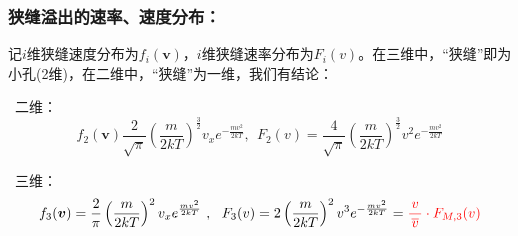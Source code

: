 \documentclass[zihao=-4,UTF8]{report}
\begin{document}
\subsubsection{狭缝溢出的速率、速度分布：}
记$i$维狭缝速度分布为$f_{i}(\boldsymbol{v})$，$i$维狭缝速率分布为$F_{i}(v)$。在三维中，“狭缝”即为小孔(2维)，在二维中，“狭缝”为一维，我们有结论：\par
{}\ 二维：
\begin{equation}
    f_2(\boldsymbol{v})\frac{2}{\sqrt{\pi}} \left(\frac{m}{2kT}\right)^{\frac{3}{2}}v_xe^{-\frac{mv^2}{2kT}}, \ \ F_2(v) = \frac{4}{\sqrt{\pi}}\left(\frac{m}{2kT} \right)^{\frac{3}{2}}v^2e^{-\frac{mv^2}{2kT}}
\end{equation}
\par
{}\ 三维：
\begin{equation}
    f_3(\boldsymbol{v}) = \frac{2}{\pi} \left( \frac{m}{2kT}\right)^2 v_x e^{\frac{mv^2}{2kT}}\ ,\ \ F_3(v) = 2\left(\frac{m}{2kT} \right)^2 v^3 e^{-\frac{mv^2}{2kT}} = \textcolor{red}{\frac{v}{\,\overline{v}\,}\cdot F_{M,3}(v)}
\end{equation}
\end{document}
